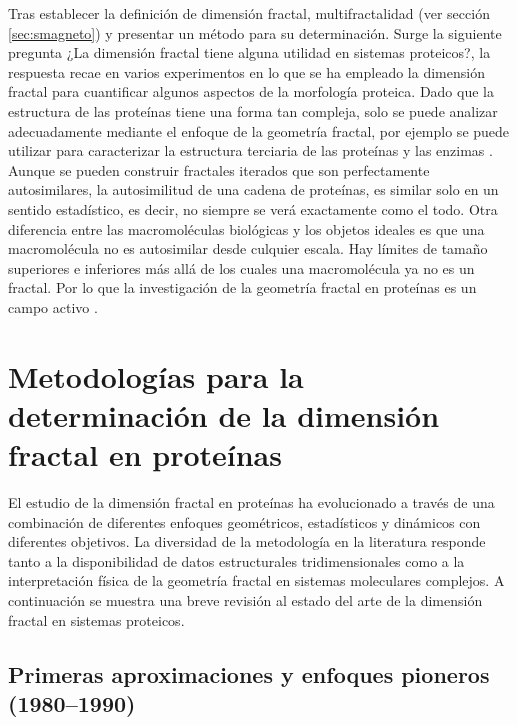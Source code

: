 Tras establecer la definición de dimensión fractal, multifractalidad (ver sección \ref{sec:smagneto}) y presentar un método para su determinación. Surge la siguiente pregunta ¿La dimensi\'{o}n fractal tiene alguna utilidad en sistemas proteicos?, la respuesta recae en varios experimentos en lo que se ha empleado la dimensión fractal para cuantificar algunos aspectos de la morfolog\'{i}a proteica. Dado que la estructura de las prote\'{i}nas tiene una forma tan compleja, solo se puede analizar adecuadamente mediante el enfoque de la geometr\'{i}a fractal, por ejemplo se puede utilizar para caracterizar la estructura terciaria de las prote\'{i}nas y las enzimas \cite{Mustafa1996}. Aunque se pueden construir fractales iterados que son perfectamente autosimilares, la autosimilitud de una cadena de prote\'{i}nas, es similar solo en un sentido estad\'{i}stico, es decir, no siempre se ver\'{a} exactamente como el todo. Otra diferencia entre las macromol\'{e}culas biol\'{o}gicas y los objetos ideales es que una macromol\'{e}cula no es autosimilar desde culquier escala. Hay l\'{i}mites de tamaño superiores e inferiores m\'{a}s all\'{a} de los cuales una macromol\'{e}cula ya no es un fractal. Por lo que la investigaci\'{o}n de la geometría fractal en prote\'{i}nas es un campo activo \cite{Mustafa1996}. 

\section{Metodolog\'{i}as para la determinaci\'{o}n de la dimensi\'{o}n fractal en prote\'{i}nas}
\label{sec:mddfp}

El estudio de la dimensi\'{o}n fractal en prote\'{i}nas ha evolucionado a trav\'{e}s de una combinaci\'{o}n de diferentes enfoques geom\'{e}tricos, estad\'{i}sticos y din\'{a}micos con diferentes objetivos. La diversidad de la metodolog\'{i}a en la literatura responde tanto a la disponibilidad de datos estructurales tridimensionales como a la interpretaci\'{o}n f\'{i}sica de la geometr\'{i}a fractal en sistemas moleculares complejos. A continuaci\'{o}n se muestra una breve revisi\'{o}n al estado del arte de la dimensi\'{o}n fractal en sistemas proteicos.

\subsection{Primeras aproximaciones y enfoques pioneros (1980--1990)}
\label{subsec:paep}

